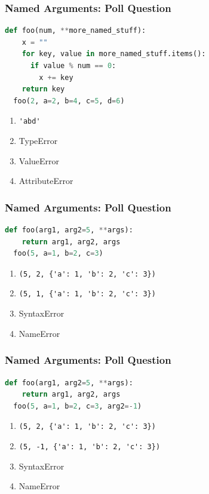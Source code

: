 \documentclass{beamer}
\begin{document}
%
%
\begin{frame}[fragile]
  \frametitle{Named Arguments: Poll Question}
  \begin{lstlisting}[language=Python, autogobble]
  def foo(num, **more_named_stuff):
    x = ""
    for key, value in more_named_stuff.items():
      if value % num == 0:
        x += key
    return key
  foo(2, a=2, b=4, c=5, d=6)
  \end{lstlisting}
  \vfill
  \begin{enumerate}[A]
    \item \lstinline|'abd'|
    \item TypeError
    \item ValueError
    \item AttributeError
  \end{enumerate}
\end{frame}

%
%
\begin{frame}[fragile]
  \frametitle{Named Arguments: Poll Question}
  \begin{lstlisting}[language=Python, autogobble]
  def foo(arg1, arg2=5, **args):
    return arg1, arg2, args
  foo(5, a=1, b=2, c=3)
  \end{lstlisting}
  \vfill
  \begin{enumerate}[A]
    \item \lstinline|(5, 2, {'a': 1, 'b': 2, 'c': 3})|
    \item \lstinline|(5, 1, {'a': 1, 'b': 2, 'c': 3})|
    \item SyntaxError
    \item NameError
  \end{enumerate}
\end{frame}

%
%
\begin{frame}[fragile]
  \frametitle{Named Arguments: Poll Question}
  \begin{lstlisting}[language=Python, autogobble]
  def foo(arg1, arg2=5, **args):
    return arg1, arg2, args
  foo(5, a=1, b=2, c=3, arg2=-1)
  \end{lstlisting}
  \vfill
  \begin{enumerate}[A]
    \item \lstinline|(5, 2, {'a': 1, 'b': 2, 'c': 3})|
    \item \lstinline|(5, -1, {'a': 1, 'b': 2, 'c': 3})|
    \item SyntaxError
    \item NameError
  \end{enumerate}
\end{frame}
\end{document}
